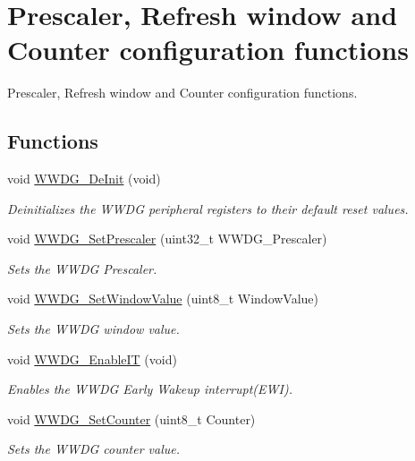 \hypertarget{group___w_w_d_g___group1}{}\section{Prescaler, Refresh window and Counter configuration functions}
\label{group___w_w_d_g___group1}


Prescaler, Refresh window and Counter configuration functions.  


\subsection*{Functions}
\begin{DoxyCompactItemize}
\item 
void \hyperlink{group___w_w_d_g___group1_ga7130f4dc861b9234b62e73f9f57f89a1}{W\+W\+D\+G\+\_\+\+De\+Init} (void)
\begin{DoxyCompactList}\small\item\em Deinitializes the W\+W\+D\+G peripheral registers to their default reset values. \end{DoxyCompactList}\item 
void \hyperlink{group___w_w_d_g___group1_gafeaa2b52c31ba7baca7eb61d2d42e07b}{W\+W\+D\+G\+\_\+\+Set\+Prescaler} (uint32\+\_\+t W\+W\+D\+G\+\_\+\+Prescaler)
\begin{DoxyCompactList}\small\item\em Sets the W\+W\+D\+G Prescaler. \end{DoxyCompactList}\item 
void \hyperlink{group___w_w_d_g___group1_gaf44a7bf8bf6b11b41cd89ff521fdd5a5}{W\+W\+D\+G\+\_\+\+Set\+Window\+Value} (uint8\+\_\+t Window\+Value)
\begin{DoxyCompactList}\small\item\em Sets the W\+W\+D\+G window value. \end{DoxyCompactList}\item 
void \hyperlink{group___w_w_d_g___group1_gac8af66ea5254d3d78b60b9b7c7f29521}{W\+W\+D\+G\+\_\+\+Enable\+I\+T} (void)
\begin{DoxyCompactList}\small\item\em Enables the W\+W\+D\+G Early Wakeup interrupt(\+E\+W\+I). \end{DoxyCompactList}\item 
void \hyperlink{group___w_w_d_g___group1_ga6e44cc35f133b28b9ad861f459bf8d76}{W\+W\+D\+G\+\_\+\+Set\+Counter} (uint8\+\_\+t Counter)
\begin{DoxyCompactList}\small\item\em Sets the W\+W\+D\+G counter value. \end{DoxyCompactList}\end{DoxyCompactItemize}


